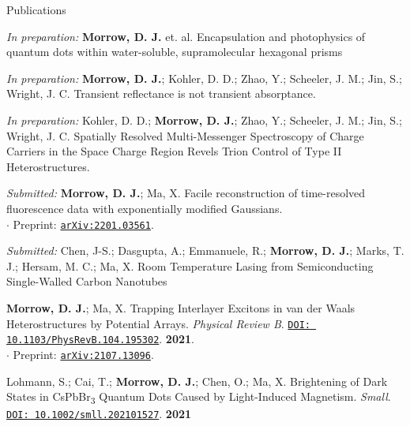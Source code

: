 \documentclass{resume} %
\begin{document}
\begin{rSection}{Publications}
	
\begin{etaremune}


\item[] \textit{In preparation:} \textbf{Morrow, D. J.} et. al. Encapsulation and photophysics of quantum dots within water-soluble, supramolecular hexagonal prisms



\item[] \textit{In preparation:} \textbf{Morrow, D. J.}; Kohler, D. D.; Zhao, Y.; Scheeler, J. M.; Jin, S.; Wright, J. C. Transient reflectance is not transient absorptance.
	
\item[] \textit{In preparation:} Kohler, D. D.; \textbf{Morrow, D. J.};  Zhao, Y.; Scheeler, J. M.; Jin, S.; Wright, J. C. Spatially Resolved Multi-Messenger Spectroscopy of Charge Carriers in the Space Charge Region Revels Trion Control of Type II Heterostructures.

\item[] \textit{Submitted:} \textbf{Morrow, D. J.}; Ma, X. Facile reconstruction of time-resolved fluorescence data with exponentially modified Gaussians.\\
$\cdot$ Preprint: \href{http://arxiv.org/abs/2201.03561}{\texttt{arXiv:2201.03561}}.

\item[] \textit{Submitted:} Chen, J-S.; Dasgupta, A.; Emmanuele, R.; \textbf{Morrow, D. J.}; Marks, T. J.; Hersam, M. C.; Ma, X. Room Temperature Lasing from Semiconducting Single-Walled Carbon Nanotubes

\item \textbf{Morrow, D. J.}; Ma, X. Trapping Interlayer Excitons in van der Waals Heterostructures by Potential Arrays.  \emph{Physical Review B}. \href{https://journals.aps.org/prb/abstract/10.1103/PhysRevB.104.195302}{\texttt{DOI: 10.1103/PhysRevB.104.195302}}. \textbf{2021}.\\
$\cdot$ Preprint: \href{http://arxiv.org/abs/2107.13096}{\texttt{arXiv:2107.13096}}.

\item Lohmann, S.; Cai, T.; \textbf{Morrow, D. J.}; Chen, O.; Ma, X. Brightening of Dark States in CsPbBr\textsubscript{3} Quantum Dots Caused by Light-Induced Magnetism. \emph{Small}. \href{https://doi.org/10.1002/smll.202101527}{\texttt{DOI: 10.1002/smll.202101527}}. \textbf{2021}


\end{etaremune}
\end{rSection}
\end{document}

